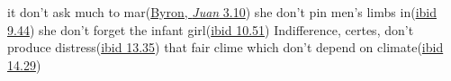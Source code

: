 \ea \label{ex:11-77}
\ea
it don't ask much to mar\hfill(\href{https://archive.org/details/workslordbyron10unkngoog/page/146/mode/2up?view=theater&q=%22don%27t%22}{Byron, \textit{Juan} 3.10})
\ex
she don't pin men's limbs in\hfill(\href{https://archive.org/details/workslordbyron10unkngoog/page/386/mode/2up?view=theater&q=%22don%27t%22}{ibid 9.44})
\ex
she don't forget the infant girl\hfill(\href{https://archive.org/details/workslordbyron10unkngoog/page/414/mode/2up?view=theater&q=%22don%27t%22}{ibid 10.51})
\ex
Indifference, certes, don't produce distress\hfill(\href{https://archive.org/details/workslordbyron10unkngoog/page/490/mode/2up?view=theater&q=%22don%27t%22}{ibid 13.35})
\ex
that fair clime which don't depend on climate\hfill(\href{https://archive.org/details/workslordbyron10unkngoog/page/522/mode/2up?view=theater&q=%22don%27t%22}{ibid 14.29})
\z \z

